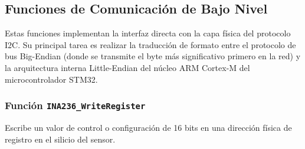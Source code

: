 \documentclass[
10pt, %
a4paper, %
oneside, %
headinclude,footinclude, %
BCOR5mm, %
]{scrartcl}
\begin{document}
\subsection{Funciones de Comunicación de Bajo Nivel}
Estas funciones implementan la interfaz directa con la capa física del protocolo I2C. Su principal tarea es realizar la traducción de formato entre el protocolo de bus Big-Endian (donde se transmite el byte más significativo primero en la red) y la arquitectura interna Little-Endian del núcleo ARM Cortex-M del microcontrolador STM32.

\subsubsection{Función \texttt{INA236\_WriteRegister}}
Escribe un valor de control o configuración de 16 bits en una dirección física de registro en el silicio del sensor.
\end{document}
